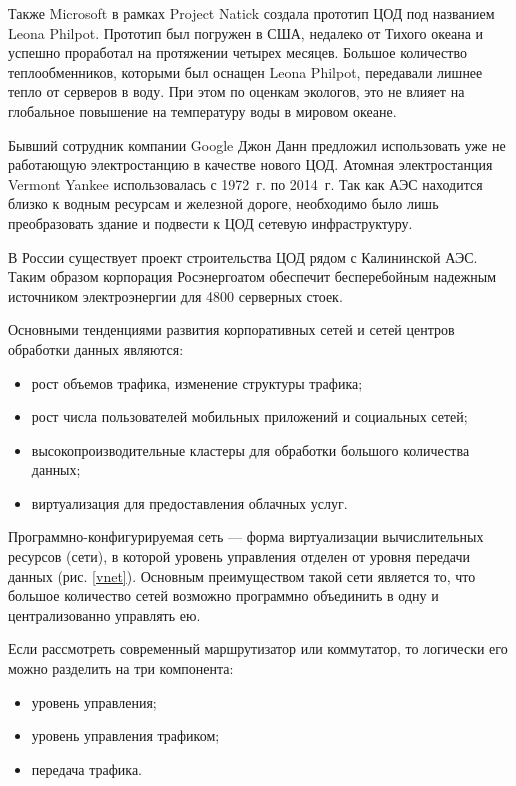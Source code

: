 Также Microsoft в рамках Project Natick создала прототип ЦОД под названием Leona Philpot.
Прототип был погружен в США, недалеко от Тихого океана и успешно проработал на протяжении четырех месяцев.
Большое количество теплообменников, которыми был оснащен Leona Philpot, передавали лишнее тепло от серверов в воду.
При этом по оценкам экологов, это не влияет на глобальное повышение на температуру воды в мировом океане.

Бывший сотрудник компании Google Джон Данн предложил использовать уже не работающую электростанцию в качестве нового ЦОД.
Атомная электростанция Vermont Yankee использовалась с 1972~г. по 2014~г.
Так как АЭС находится близко к водным ресурсам и железной дороге, необходимо было лишь преобразовать здание и подвести к ЦОД сетевую инфраструктуру.

В России существует проект строительства ЦОД рядом с Калининской АЭС.
Таким образом корпорация Росэнергоатом обеспечит бесперебойным надежным источником электроэнергии для 4800 серверных стоек.

Основными тенденциями развития корпоративных сетей и сетей центров обработки данных являются:
\begin{itemize}
  \item рост объемов трафика, изменение структуры трафика;
  \item рост числа пользователей мобильных приложений и социальных сетей;
  \item высокопроизводительные кластеры для обработки большого количества данных;
  \item виртуализация для предоставления облачных услуг.
\end{itemize}

Программно-конфигурируемая сеть --- форма виртуализации вычислительных ресурсов (сети), в которой уровень управления отделен от уровня передачи данных (рис. \ref{vnet}).
Основным преимуществом такой сети является то, что большое количество сетей возможно программно объединить в одну и централизованно управлять ею.


Если рассмотреть современный маршрутизатор или коммутатор, то логически его можно разделить на три компонента:
\begin{itemize}
  \item уровень управления;
  \item уровень управления трафиком;
  \item передача трафика.
\end{itemize}

